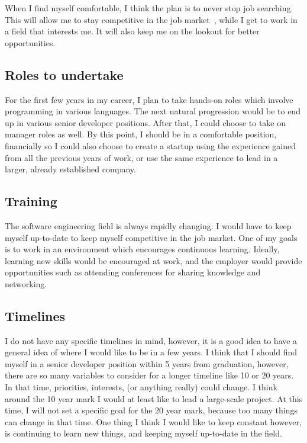When I find myself comfortable, I think the plan is to never stop job searching.
This will allow me to stay competitive in the job market~\cite{kleiman_2015},
while I get to work in a field that interests me. It will also keep me on the
lookout for better opportunities.


\subsection{Roles to undertake}
For the first few years in my career, I plan to take hands-on roles which
involve programming in various languages. The next natural progression would be
to end up in various senior developer positions. After that, I could choose to
take on manager roles as well. By this point, I should be in a comfortable
position, financially so I could also choose to create a startup using the
experience gained from all the previous years of work, or use the same
experience to lead in a larger, already established company.

\subsection{Training}
The software engineering field is always rapidly changing. I would have to keep
myself up-to-date to keep myself competitive in the job market. One of my goals
is to work in an environment which encourages continuous learning. Ideally,
learning new skills would be encouraged at work, and the employer would provide
opportunities such as attending conferences for sharing knowledge and
networking. 

\subsection{Timelines}
I do not have any specific timelines in mind, however, it is a good idea to have
a general idea of where I would like to be in a few years. I think that I
should find myself in a senior developer position within 5 years from
graduation, however, there are so many variables to consider for a longer
timeline like 10 or 20 years. In that time, priorities, interests, (or anything
really) could change. I think around the 10 year mark I would at least like to
lead a large-scale project. At this time, I will not set a specific goal for the
20 year mark, because too many things can change in that time. One thing I think
I would like to keep constant however, is continuing to learn new things, and
keeping myself up-to-date in the field. 

